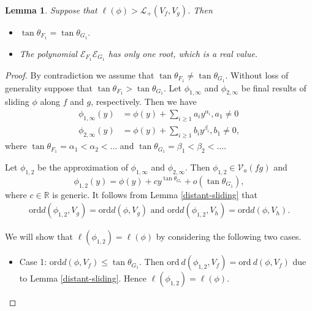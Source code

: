 \documentclass[10pt,a4paper]{amsart}
\newtheorem{lemma}{Lemma}
\begin{document}
	\begin{lemma}\label{claim1} 
		Suppose that $\ell(\phi) > \mathscr{L}_+(V_f, V_g)$. Then 
    \begin{itemize}
        \item[(i)] $\tan\theta_{F_1} = \tan\theta_{G_1}.$
        \item[(ii)] The polynomial $\mathcal{E}_{F_1}\mathcal{E}_{G_1}$ has only one root, which is a real value.
    \end{itemize}
		\end{lemma}

	\begin{proof}
    By contradiction we assume that $\tan\theta_{F_1} \neq \tan\theta_{G_1}.$ Without loss of generality suppose that $\tan\theta_{F_1} > \tan\theta_{G_1}.$ Let $\phi_{1,\infty}$ and $\phi_{2,\infty}$ be final results of sliding $\phi$ along $f$ and $g$, respectively. Then we have 
	\begin{align}
		\phi_{1,\infty}(y) &= \phi(y) + \sum_{i \ge 1}a_iy^{\alpha_i}, a_1\neq 0\\
		\phi_{2,\infty}(y) &= \phi(y) + \sum_{i \ge 1}b_iy^{\beta_i}, b_1\neq 0,
	\end{align}
	where $\tan\theta_{F_1}=\alpha_1 <\alpha_2 < \ldots$ and $\tan\theta_{G_1} =\beta_1 < \beta_2 <
    \ldots $.
    
    Let $\phi_{1,2}$ be the approximation of $\phi_{1,\infty}$ and $\phi_{2,\infty}$. Then $\phi_{1,2}\in \mathcal{V}_a(fg)$ and
	$$ \phi_{1,2}(y) = \phi(y) + cy^{\tan\theta_{G_1}} + o(\tan\theta_{G_1}), $$ where $c \in \mathbb{R}$ is generic. It follows from Lemma \ref{distant-sliding} that
    	\begin{align}\label{order-with-Vg}
    		\mathrm{ord}d(\phi_{1,2}, V_g) = \mathrm{ord}d(\phi, V_g) \text{ and } \mathrm{ord}d(\phi_{1,2}, V_h) = \mathrm{ord}d(\phi, V_h).
    	\end{align}
    	 
We will show that $\ell(\phi_{1,2})=\ell(\phi)$ by considering the following two cases.

\begin{itemize}
	\item Case 1: 	$\mathrm{ord}d(\phi, V_f) \leq \tan\theta_{G_1}$. Then $\mathrm{ord}\ d(\phi_{1,2}, V_f) = \mathrm{ord}\ d(\phi, V_f)$ due to Lemma \ref{distant-sliding}. Hence $\ell(\phi_{1,2})=\ell(\phi)$.
    

\end{itemize}
\end{proof}
\end{document}
